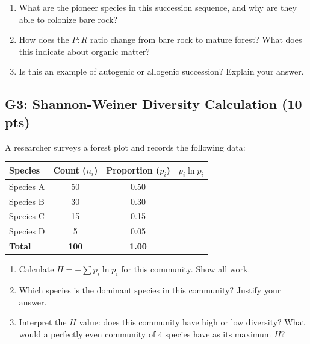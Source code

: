 \documentclass[11pt]{article}
\begin{document}
\begin{enumerate}[label=\alph*.]
  \item What are the pioneer species in this succession sequence, and why are they able to colonize bare rock?
  \vspace{1.5cm}
  \item How does the $P\!:\!R$ ratio change from bare rock to mature forest? What does this indicate about organic matter?
  \vspace{1.5cm}
  \item Is this an example of autogenic or allogenic succession? Explain your answer.
  \vspace{1.5cm}
\end{enumerate}

\subsection*{G3: Shannon-Weiner Diversity Calculation (10 pts)}

A researcher surveys a forest plot and records the following data:

\vspace{0.3cm}
\begin{center}
\begin{tabular}{lccc}
\toprule
\textbf{Species} & \textbf{Count ($n_i$)} & \textbf{Proportion ($p_i$)} & \textbf{$p_i \ln p_i$} \\
\midrule
Species A & 50 & 0.50 & \underline{\hspace{2cm}} \\
Species B & 30 & 0.30 & \underline{\hspace{2cm}} \\
Species C & 15 & 0.15 & \underline{\hspace{2cm}} \\
Species D &  5 & 0.05 & \underline{\hspace{2cm}} \\
\midrule
\textbf{Total} & \textbf{100} & \textbf{1.00} & \\
\bottomrule
\end{tabular}
\end{center}

\vspace{0.3cm}
\begin{enumerate}[label=\alph*.]
  \item Calculate $H = -\sum p_i \ln p_i$ for this community. Show all work.
  \vspace{2cm}
  \item Which species is the dominant species in this community? Justify your answer.
  \vspace{1cm}
  \item Interpret the $H$ value: does this community have high or low diversity? What would a perfectly even community of 4 species have as its maximum $H$?
  \vspace{1.5cm}
\end{enumerate}
\end{document}
